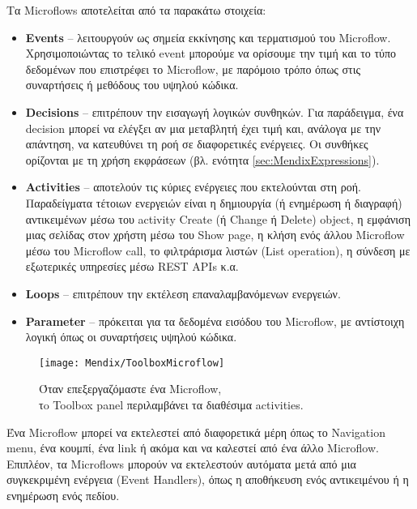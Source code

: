             Τα Microflows αποτελείται από τα παρακάτω στοιχεία:
                \begin{itemize}[label={\tiny \blacksquare}]
                    \setlength\itemsep{-0.25em}
                    \item \textbf{Events} -- λειτουργούν ως σημεία εκκίνησης και τερματισμού του Microflow. Χρησιμοποιώντας το τελικό event μπορούμε να ορίσουμε την τιμή και το τύπο δεδομένων που επιστρέφει το Microflow, με παρόμοιο τρόπο όπως στις συναρτήσεις ή μεθόδους του υψηλού κώδικα.
                    \item \textbf{Decisions} -- επιτρέπουν την εισαγωγή λογικών συνθηκών. Για παράδειγμα, ένα decision μπορεί να ελέγξει αν μια μεταβλητή έχει τιμή και, ανάλογα με την απάντηση, να κατευθύνει τη ροή σε διαφορετικές ενέργειες. Οι συνθήκες ορίζονται με τη χρήση εκφράσεων (βλ. ενότητα \ref{sec:MendixExpressions}).
                    \item \textbf{Activities} -- αποτελούν τις κύριες ενέργειες που εκτελούνται στη ροή. Παραδείγματα τέτοιων ενεργειών είναι η δημιουργία (ή ενημέρωση ή διαγραφή) αντικειμένων μέσω του activity Create (ή Change ή Delete) object, η εμφάνιση μιας σελίδας στον χρήστη μέσω του Show page, η κλήση ενός άλλου Microflow μέσω του Microflow call, το φιλτράρισμα λιστών (List operation), η σύνδεση με εξωτερικές υπηρεσίες μέσω REST APIs κ.α.
                    \item \textbf{Loops} --  επιτρέπουν την εκτέλεση επαναλαμβανόμενων ενεργειών.
                    \item \textbf{Parameter} -- πρόκειται για τα δεδομένα εισόδου του Microflow, με αντίστοιχη λογική όπως οι συναρτήσεις υψηλού κώδικα.
                \end{itemize}

            \begin{figure}[h!] \noindent \centering
                \texttt{[image: Mendix/ToolboxMicroflow]}
                \caption{\centering Όταν επεξεργαζόμαστε ένα Microflow, \\ τo Toolbox panel περιλαμβάνει τα διαθέσιμα activities.}
            \end{figure}

            Ένα Microflow μπορεί να εκτελεστεί από διαφορετικά μέρη όπως το Navigation menu, ένα κουμπί, ένα link ή ακόμα και να καλεστεί από ένα άλλο Microflow. Επιπλέον, τα Microflows μπορούν να εκτελεστούν αυτόματα μετά από μια συγκεκριμένη ενέργεια (Event Handlers), όπως η αποθήκευση ενός αντικειμένου ή η ενημέρωση ενός πεδίου.

